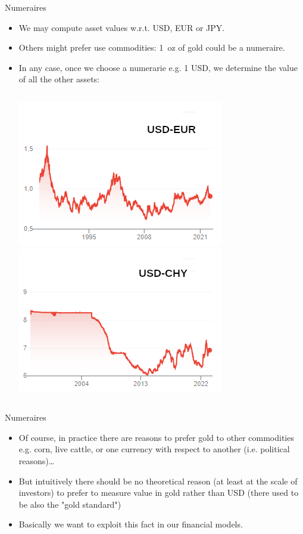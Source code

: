 \documentclass{beamer}
\begin{document}
\begin{frame}{Numeraires}
  \begin{itemize}
  \item We may compute asset values w.r.t. USD, EUR or JPY.
  \item Others might prefer use commodities: 1~oz of gold could be a numeraire.
  \item In any case, once we choose a numerarie e.g. 1 USD, we determine the value of all the other assets:
    \begin{columns}
      \includegraphics[width=0.9\linewidth]{usd_eur}
      \includegraphics[width=0.9\linewidth]{usd_chy}
    \end{columns}
  \end{itemize}
\end{frame}

\begin{frame}{Numeraires}
  \begin{itemize}
  \item Of course, in practice there are reasons to prefer gold to other commodities e.g. corn, live cattle, or one currency with respect to another (i.e. political reasons)\ldots
  \item But intuitively there should be no theoretical reason (at least at the scale of investors) to prefer to measure value in gold rather than USD (there used to be also the "gold standard")
  \item Basically we want to exploit this fact in our financial models.
  \end{itemize}
\end{frame}
\end{document}
